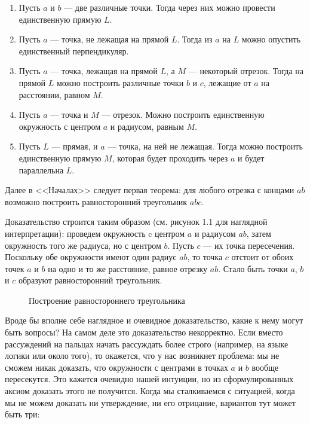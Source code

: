 \begin{enumerate}
\item Пусть $a$ и $b$ --- две различные точки. Тогда через них можно провести единственную прямую $L$.
\item Пусть $a$ --- точка, не лежащая на прямой $L$. Тогда из $a$ на $L$ можно опустить единственный перпендикуляр.
\item Пусть $a$ --- точка, лежащая на прямой $L$, а $M$ --- некоторый отрезок. Тогда на прямой $L$ можно построить различные точки $b$ и $c$, лежащие от $a$ на расстоянии, равном $M$.
\item Пусть $a$ --- точка и $M$ --- отрезок. Можно построить единственную окружность с центром $a$ и радиусом, равным $M$.
\item Пусть $L$ --- прямая, и $a$ --- точка, на ней не лежащая. Тогда можно построить единственную прямую $M$, которая будет проходить через $a$ и будет параллельна $L$.
\end{enumerate}

Далее в <<Началах>> следует первая теорема: для любого отрезка с концами $ab$ возможно построить равносторонний треугольник $abc$.

Доказательство строится таким образом (см. рисунок 1.1 для наглядной интерпретации): проведем окружность c центром $a$ и радиусом $ab$, затем окружность того же радиуса, но с центром $b$. Пусть $c$ --- их точка пересечения. Поскольку обе окружности имеют один радиус $ab$, то точка $c$ отстоит от обоих точек $a$ и $b$ на одно и то же расстояние, равное отрезку $ab$. Стало быть точки $a$, $b$ и $c$ образуют равносторонний треугольник.

\begin{figure}[h]
\centering
{}
\caption{Построение равностороннего треугольника}
\end{figure}

Вроде бы вполне себе наглядное и очевидное доказательство, какие к нему могут быть вопросы? На самом деле это доказательство некорректно. Если вместо рассуждений на пальцах начать рассуждать более строго (например, на языке логики или около того), то окажется, что у нас возникнет проблема: мы не сможем никак доказать, что окружности с центрами в точках $a$ и $b$ вообще пересекутся. Это кажется очевидно нашей интуиции, но из сформулированных аксиом доказать этого не получится. Когда мы сталкиваемся с ситуацией, когда мы не можем доказать ни утверждение, ни его отрицание, вариантов тут может быть три:

